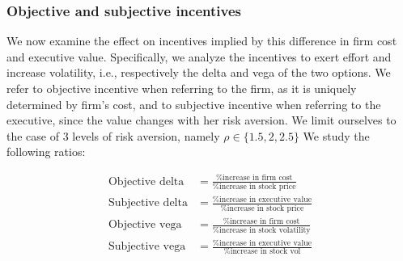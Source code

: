 











\subsubsection{Objective and subjective incentives}
We now examine the effect on incentives implied by this difference in firm cost and executive value. Specifically, we analyze the incentives to exert effort and increase volatility, i.e., respectively the delta and vega of the two options. We refer to objective incentive when referring to the firm, as it is uniquely determined by firm's cost, and to subjective incentive when referring to the executive, since the value changes with her risk aversion. We limit ourselves to the case of 3 levels of risk aversion, namely $\rho \in \{1.5, 2, 2.5\}$ We study the following ratios: 

\vspace{-2em}

\begin{align*}
\text{Objective delta} &= \frac{\text{\% increase in firm cost}}{\text{\% increase in stock price}} \\[1em]
\text{Subjective delta} &= \frac{\text{\% increase in executive value}}{\text{\% increase in stock price}} \\[1em]
\text{Objective vega} &= \frac{\text{\% increase in firm cost}}{\text{\% increase in stock volatility}} \\[1em]
\text{Subjective vega} &= \frac{\text{\% increase in executive value}}{\text{\% increase in stock vol}}
\end{align*}

